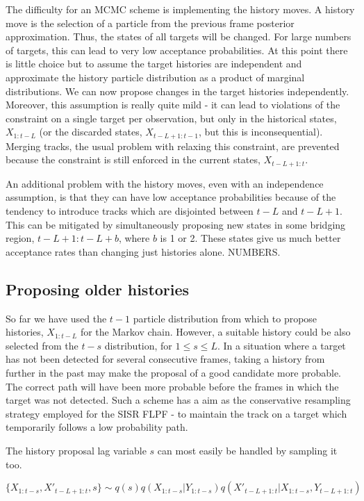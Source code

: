 The difficulty for an MCMC scheme is implementing the history moves. A history move is the selection of a particle from the previous frame posterior approximation. Thus, the states of all targets will be changed. For large numbers of targets, this can lead to very low acceptance probabilities. At this point there is little choice but to assume the target histories are independent and approximate the history particle distribution as a product of marginal distributions. We can now propose changes in the target histories independently. Moreover, this assumption is really quite mild - it can lead to violations of the constraint on a single target per observation, but only in the historical states, $X_{1:t-L}$ (or the discarded states, $X_{t-L+1:t-1}$, but this is inconsequential). Merging tracks, the usual problem with relaxing this constraint, are prevented because the constraint is still enforced in the current states, $X_{t-L+1:t}$.

An additional problem with the history moves, even with an independence assumption, is that they can have low acceptance probabilities because of the tendency to introduce tracks which are disjointed between $t-L$ and $t-L+1$. This can be mitigated by simultaneously proposing new states in some bridging region, $t-L+1:t-L+b$, where $b$ is 1 or 2. These states give us much better acceptance rates than changing just histories alone. NUMBERS.



\subsection{Proposing older histories}
So far we have used the $t-1$ particle distribution from which to propose histories, $X_{1:t-L}$ for the Markov chain. However, a suitable history could be also selected from the $t-s$ distribution, for $1 \le s \le L$. In a situation where a target has not been detected for several consecutive frames, taking a history from further in the past may make the proposal of a good candidate more probable. The correct path will have been more probable before the frames in which the target was not detected. Such a scheme has a aim as the conservative resampling strategy employed for the SISR FLPF - to maintain the track on a target which temporarily follows a low probability path.

The history proposal lag variable $s$ can most easily be handled by sampling it too.

\begin{equation}
\{X_{1:t-s}, X'_{t-L+1:t}, s\} \sim q(s) q(X_{1:t-s}|Y_{1:t-s}) q(X'_{t-L+1:t}|X_{1:t-s}, Y_{t-L+1:t})
\label{eq:ExtendedFLProposal}
\end{equation}

